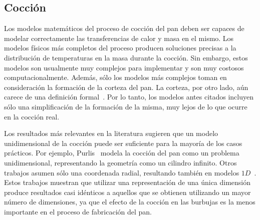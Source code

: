 \subsection{Cocción}
Los modelos matemáticos del proceso de cocción del pan deben ser capaces de modelar correctamente las transferencias de calor y masa en el mismo.
Los modelos físicos más completos del proceso producen soluciones precisas a la distribución de temperaturas en la masa durante la cocción.
Sin embargo, estos modelos son usualmente muy complejos para implementar y son muy costosos computacionalmente.
Además, sólo los modelos más complejos toman en consideración la formación de la corteza del pan.
La corteza, por otro lado, aún carece de una definición formal~\cite{Vanin2009}.
Por lo tanto, los modelos antes citados incluyen sólo una simplificación de la formación de la misma, muy lejos de lo que ocurre en la cocción real.

Los resultados más relevantes en la literatura sugieren que un modelo unidimensional de la cocción puede ser suficiente para la mayoría de los casos prácticos.
Por ejemplo, Purlis~\cite{Purlis2011} modela la cocción del pan como un problema unidimensional, representando la geometría como un cilindro infinito.
Otros trabajos asumen sólo una coordenada radial, resultando también en modelos $1D$~\cite{Powathil2004, Thorvaldsson1999}.
Estos trabajos muestran que utilizar una representación de una única dimensión produce resultados casi idénticos a aquellos que se obtienen utilizando un mayor número de dimensiones, ya que el efecto de la cocción en las burbujas es la menos importante en el proceso de fabricación del pan.

